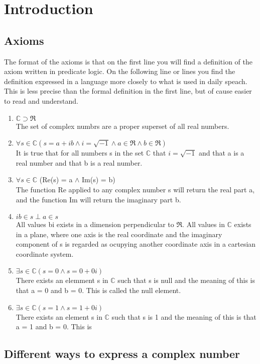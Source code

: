 	\chapter{Introduction}
	\section{Axioms}
	The format of the axioms is that on the first line you will find a definition of the axiom written in predicate logic. 
	On the following line or lines you find the definition expressed in a language more closely to 
	what is used in daily speach. This is less precise than the formal definition in the first line, but of cause easier to read and understand.
	\begin{enumerate}
		\item $\mathbb{C} \supset \Re$ \\ The set of complex numbrs are a proper superset of all real numbers.
		\item $\forall s \in \mathbb{C} ( s = a + ib \wedge i = \sqrt{-1} \wedge a \in \Re \wedge b \in \Re)$ \\ It is true that for all numbers s in the set $\mathbb{C}$ that $ i = \sqrt{-1}$ and that a is a real number and that b is a real number.
		\item $\forall s \in \mathbb{C}$ (Re(s) = a $\wedge$ Im(s) = b) \\ The function Re applied to any complex number s will return the real part a, and the function Im will return the imaginary part b.
		\item $ ib \in s \perp a \in s $ \\ All values bi exists in a dimension perpendicular to $\Re$. All values in $\mathbb{C}$ exists in a plane, where one axis is the real coordinate and the imaginary component of s is regarded as ocupying another coordinate axis in a cartesian coordinate system.
		\item $\exists s \in \mathbb{C} (s = 0 \wedge s = 0 + 0i) $ \\ There exists an elemment s in $\mathbb{C}$ such that s is null and the meaning of this is that a = 0 and b = 0. This is called the null element.
		\item $\exists s \in \mathbb{C} (s = 1 \wedge s = 1+0i) $ \\ There exists an element s in $\mathbb{C}$ such that s is 1 and the meaning of this is that a = 1 and b = 0. This is 
	\end{enumerate}
	
	\section{Different ways to express a complex number}
